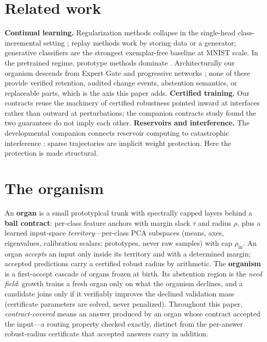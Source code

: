 \documentclass{article}
\begin{document}
\section{Related work}
\textbf{Continual learning.} Regularization methods
\citep{kirkpatrick2017ewc} collapse in the single-head class-incremental
setting \citep{vandeven2019three}; replay methods
\citep{shin2017dgr,rebuffi2017icarl} work by storing data or a generator;
generative classifiers \citep{vandeven2021generative} are the strongest
exemplar-free baseline at MNIST scale. In the pretrained regime, prototype
methods dominate \citep{zhou2023simplecil,petit2023fetril,mcdonnell2023ranpac}.
Architecturally our organism descends from Expert Gate
\citep{aljundi2017expertgate} and progressive networks
\citep{rusu2016progressive}; none of these provide verified retention,
audited change events, abstention semantics, or replaceable parts, which is
the axis this paper adds. \textbf{Certified training.} Our contracts reuse the
machinery of certified robustness \citep{gowal2018ibp} pointed inward at
interfaces rather than outward at perturbations; the companion contracts study
found the two guarantees do not imply each other. \textbf{Reservoirs and
interference.} The developmental companion connects reservoir computing
\citep{jaeger2001echo,maass2002liquid} to catastrophic interference
\citep{mccloskey1989catastrophic}: sparse trajectories are implicit
weight protection. Here the protection is made structural.

\section{The organism}\label{sec:organism}
An \textbf{organ} is a small prototypical trunk with spectrally capped layers
behind a \textbf{ball contract}: per-class feature anchors with margin slack
$\tau$ and radius $\rho$, plus a learned input-space \emph{territory}---per-class
PCA subspaces (means, axes, eigenvalues, calibration scalars; prototypes, never
raw samples) with cap $\rho_{\mathrm{in}}$. An organ \emph{accepts} an input
only inside its territory and with a determined margin; accepted predictions
carry a certified robust radius by arithmetic. The \textbf{organism} is a
first-accept cascade of organs frozen at birth. Its abstention region is the
\emph{need field}: growth trains a fresh organ only on what the organism
declines, and a candidate joins only if it verifiably improves the declined
validation mass (certificate parameters are solved, never penalized).
Throughout this paper, \emph{contract-covered} means an answer produced by an
organ whose contract accepted the input---a routing property checked exactly,
distinct from the per-answer robust-radius certificate that accepted answers
carry in addition.
\end{document}
